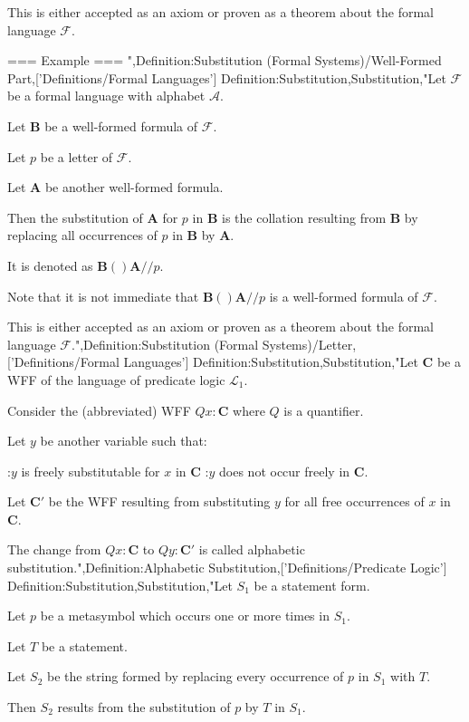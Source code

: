 This is either accepted as an axiom or proven as a theorem about the formal language $\mathcal F$.


=== Example ===
",Definition:Substitution (Formal Systems)/Well-Formed Part,['Definitions/Formal Languages']
Definition:Substitution,Substitution,"Let $\mathcal F$ be a formal language with alphabet $\mathcal A$.

Let $\mathbf B$ be a well-formed formula of $\mathcal F$.

Let $p$ be a letter of $\mathcal F$.

Let $\mathbf A$ be another well-formed formula.

Then the substitution of $\mathbf A$ for $p$ in $\mathbf B$ is the collation resulting from $\mathbf B$ by replacing all occurrences of $p$ in $\mathbf B$ by $\mathbf A$.

It is denoted as $\mathbf B \left(   \right){\mathbf A \mathbin {//} p}$.


Note that it is not immediate that $\mathbf B \left(   \right){\mathbf A \mathbin {//} p}$ is a well-formed formula of $\mathcal F$.

This is either accepted as an axiom or proven as a theorem about the formal language $\mathcal F$.",Definition:Substitution (Formal Systems)/Letter,['Definitions/Formal Languages']
Definition:Substitution,Substitution,"Let $\mathbf C$ be a WFF of the language of predicate logic $\mathcal L_1$.

Consider the (abbreviated) WFF $Q x: \mathbf C$ where $Q$ is a quantifier.

Let $y$ be another variable such that:

:$y$ is freely substitutable for $x$ in $\mathbf C$
:$y$ does not occur freely in $\mathbf C$.


Let $\mathbf C'$ be the WFF resulting from substituting $y$ for all free occurrences of $x$ in $\mathbf C$.

The change from $Q x: \mathbf C$ to $Q y: \mathbf C'$ is called alphabetic substitution.",Definition:Alphabetic Substitution,['Definitions/Predicate Logic']
Definition:Substitution,Substitution,"Let $S_1$ be a statement form.

Let $p$ be a metasymbol which occurs one or more times in $S_1$.

Let $T$ be a statement.

Let $S_2$ be the string formed by replacing every occurrence of $p$ in $S_1$ with $T$.


Then $S_2$ results from the substitution of $p$ by $T$ in $S_1$.

